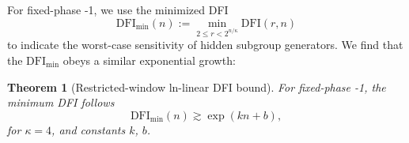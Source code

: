 \documentclass[reprint, aps, prl, superscriptaddress]{revtex4-2}
\newcommand{\rev}[1]{\textcolor{revisioncolor}{#1}}
\newcommand{\myqc}{\text{HP}}
\newcommand{\fii}{\mathrm{DFI}}
\newtheorem{theorem}{Theorem}
\begin{document}





\rev{For fixed-phase \myqc-1, we use the minimized DFI
\begin{equation}
    \fii_{\min}(n)
    :=
    \min_{2\le r<2^{n/\kappa}}\fii(r,n)
\label{eq:hp1_min_dfi_definition_maintext}
\end{equation}
to indicate the worst-case sensitivity of hidden subgroup generators. We find that the $\fii_{\min}$ obeys a similar exponential growth:}

\rev{\begin{theorem}[Restricted-window ln-linear DFI bound]
\label{thm:hp1_first_order_fisher_transfer_maintext}
For fixed-phase \myqc-1, the minimum DFI follows
\begin{equation}
    \fii_{\min}(n)
    \gtrsim
    \exp(kn+b),
    \label{eq:hp1_restricted_window_ln_linear_bound_maintext}
\end{equation}
for $\kappa=4$, and constants \(k\), \(b\).
\end{theorem}}
\end{document}
